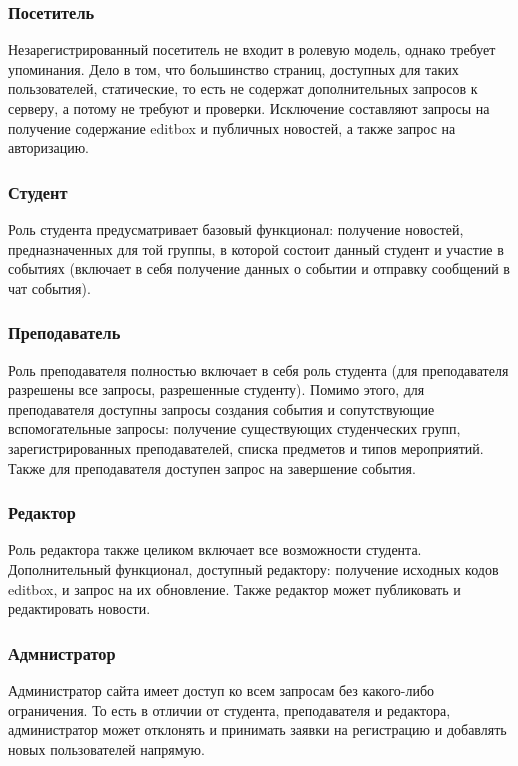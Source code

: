 \documentclass[14pt]{extarticle}
\begin{document}
\subsubsection{Посетитель}
Незарегистрированный посетитель не входит в ролевую модель, однако требует упоминания. Дело в том, что большинство страниц, доступных для таких пользователей, статические, то есть не содержат дополнительных запросов к серверу, а потому не требуют и проверки. Исключение составляют запросы на получение содержание editbox и публичных новостей, а также запрос на авторизацию. 

\subsubsection{Студент}
Роль студента предусматривает базовый функционал: получение новостей, предназначенных для той группы, в которой состоит данный студент и участие в событиях (включает в себя получение данных о событии и отправку сообщений в чат события).

\subsubsection{Преподаватель}
Роль преподавателя полностью включает в себя роль студента (для преподавателя разрешены все запросы, разрешенные студенту). Помимо этого, для преподавателя доступны запросы создания события и сопутствующие вспомогательные запросы: получение существующих студенческих групп, зарегистрированных преподавателей, списка предметов и типов мероприятий. Также для преподавателя доступен запрос на завершение события.

\subsubsection{Редактор}
Роль редактора также целиком включает все возможности студента. Дополнительный функционал, доступный редактору: получение исходных кодов editbox, и запрос на их обновление. Также редактор может публиковать и редактировать новости.

\subsubsection{Адмнистратор}
Администратор сайта имеет доступ ко всем запросам без какого-либо ограничения. То есть в отличии от студента, преподавателя и редактора, администратор может отклонять и принимать заявки на регистрацию и добавлять новых пользователей напрямую.
\end{document}
